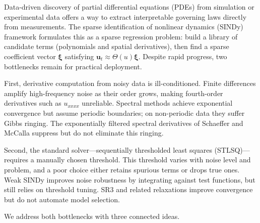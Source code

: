 \documentclass[preprint,12pt]{elsarticle}
\begin{document}
Data-driven discovery of partial differential equations (PDEs) from simulation or experimental data offers a way to extract interpretable governing laws directly from measurements. The sparse identification of nonlinear dynamics (SINDy) framework \cite{brunton2016discovering,rudy2017data} formulates this as a sparse regression problem: build a library of candidate terms (polynomials and spatial derivatives), then find a sparse coefficient vector $\boldsymbol{\xi}$ satisfying $\mathbf{u}_t \approx \Theta(u)\boldsymbol{\xi}$. Despite rapid progress, two bottlenecks remain for practical deployment.

First, derivative computation from noisy data is ill-conditioned. Finite differences amplify high-frequency noise as their order grows, making fourth-order derivatives such as $u_{xxxx}$ unreliable. Spectral methods achieve exponential convergence but assume periodic boundaries; on non-periodic data they suffer Gibbs ringing. The exponentially filtered spectral derivatives of Schaeffer and McCalla \cite{schaeffer2017learning} suppress but do not eliminate this ringing.

Second, the standard solver---sequentially thresholded least squares (STLSQ)---requires a manually chosen threshold. This threshold varies with noise level and problem, and a poor choice either retains spurious terms or drops true ones. Weak SINDy \cite{messenger2021weak} improves noise robustness by integrating against test functions, but still relies on threshold tuning. SR3 \cite{kaheman2020sindypi} and related relaxations \cite{champion2020unified,gurevich2019robust} improve convergence but do not automate model selection.

We address both bottlenecks with three connected ideas.
\end{document}

